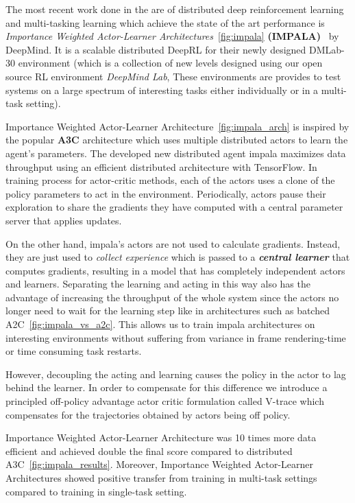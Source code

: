 The most recent work done in the are of distributed deep reinforcement learning and multi-tasking learning which achieve the state of the art performance is \textit{Importance Weighted Actor-Learner Architectures}~\ref{fig:impala} \textbf{(IMPALA)}~\parencite{espeholt2018impala} by DeepMind. It is a scalable distributed DeepRL for their newly designed DMLab-30 environment (which is a collection of new levels designed using our open source RL environment \textit{DeepMind Lab}, These environments are provides to test systems on a large spectrum of interesting tasks either individually or in a multi-task setting).

Importance Weighted Actor-Learner Architecture~\ref{fig:impala_arch} is inspired by the popular \textbf{A3C} architecture which uses multiple distributed actors to learn the agent’s parameters. The developed new distributed agent impala maximizes data throughput using an efficient distributed architecture with TensorFlow. 
In training process for actor-critic methods, each of the actors uses a clone of the policy parameters to act in the environment. Periodically, actors pause their exploration to share the gradients they have computed with a central parameter server that applies updates. 

On the other hand, impala's actors are not used to calculate gradients. Instead, they are just used to \textit{collect experience} which is passed to a \textit{\textbf{central learner}} that computes gradients, resulting in a model that has completely independent actors and learners. 
Separating the learning and acting in this way also has the advantage of increasing the throughput of the whole system since the actors no longer need to wait for the learning step like in architectures such as batched A2C~\ref{fig:impala_vs_a2c}. This allows us to train impala architectures on interesting environments without suffering from variance in frame rendering-time or time consuming task restarts.

However, decoupling the acting and learning causes the policy in the actor to lag behind the learner. In order to compensate for this difference we introduce a principled off-policy advantage actor critic formulation called V-trace which compensates for the trajectories obtained by actors being off policy.

Importance Weighted Actor-Learner Architecture was 10 times more data efficient and achieved double the final score compared to distributed A3C~\ref{fig:impala_results}.  Moreover, Importance Weighted Actor-Learner Architectures showed positive transfer from training in multi-task settings compared to training in single-task setting.

